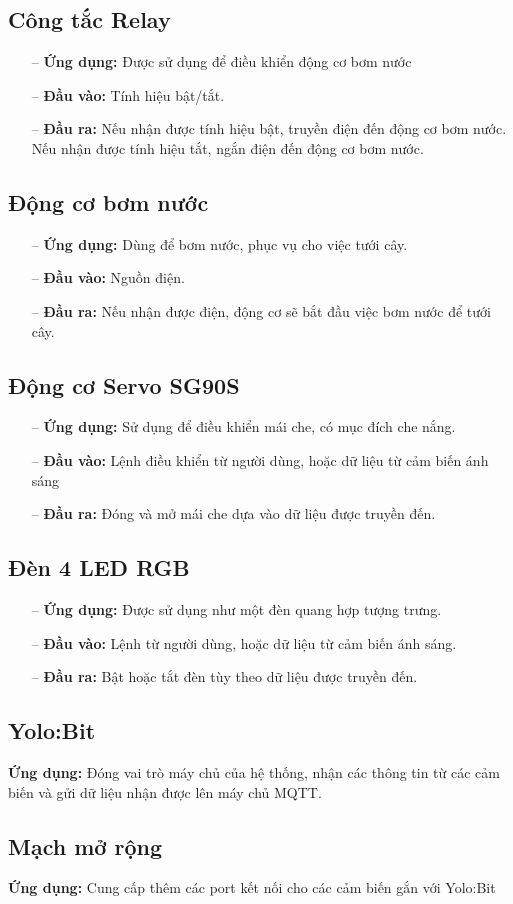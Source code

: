 \subsection{Công tắc Relay}
\begin{itemize}
    \item [--] \textbf{Ứng dụng:} Được sử dụng để điều khiển động cơ bơm nước
    \item [--] \textbf{Đầu vào:} Tính hiệu bật/tắt.
    \item [--] \textbf{Đầu ra:} Nếu nhận được tính hiệu bật, truyền điện đến động cơ bơm nước. Nếu nhận được tính hiệu tắt, ngắn điện đến động cơ bơm nước.
\end{itemize}

\subsection{Động cơ bơm nước}
\begin{itemize}
    \item [--] \textbf{Ứng dụng:} Dùng để bơm nước, phục vụ cho việc tưới cây.
    \item [--] \textbf{Đầu vào:} Nguồn điện.
    \item [--] \textbf{Đầu ra:} Nếu nhận được điện, động cơ sẽ bắt đầu việc bơm nước để tưới cây.
\end{itemize}

\subsection{Động cơ Servo SG90S}
\begin{itemize}
    \item [--] \textbf{Ứng dụng:} Sử dụng để điều khiển mái che, có mục đích che nắng.
    \item [--] \textbf{Đầu vào:} Lệnh điều khiển từ người dùng, hoặc dữ liệu từ cảm biến ánh sáng
    \item [--] \textbf{Đầu ra:} Đóng và mở mái che dựa vào dữ liệu được truyền đến.
\end{itemize}

\subsection{Đèn 4 LED RGB}
\begin{itemize}
    \item [--] \textbf{Ứng dụng:} Được sử dụng như một đèn quang hợp tượng trưng.
    \item [--] \textbf{Đầu vào:} Lệnh từ người dùng, hoặc dữ liệu từ cảm biến ánh sáng.
    \item [--] \textbf{Đầu ra:} Bật hoặc tắt đèn tùy theo dữ liệu được truyền đến.
\end{itemize}

\subsection{Yolo:Bit}
\textbf{Ứng dụng:} Đóng vai trò máy chủ của hệ thống, nhận các thông tin từ các cảm biến và gửi dữ liệu nhận được lên máy chủ MQTT.

\subsection{Mạch mở rộng}
\textbf{Ứng dụng:} Cung cấp thêm các port kết nối cho các cảm biến gắn với Yolo:Bit
\newpage